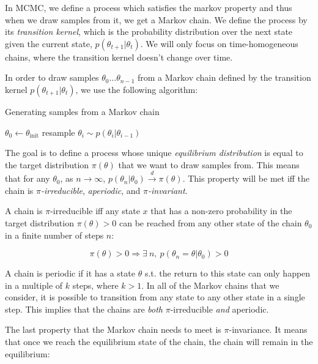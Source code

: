 \documentclass[12pt]{article}
\begin{document}
{In MCMC, we define a process which satisfies the markov property and thus when we draw samples from it, we get a Markov chain. We define the process by its \textit{transition kernel}, which is the probability distribution over the next state given the current state, $p(\theta_{t+1}|\theta_t)$. We will only focus on time-homogeneous chains, where the transition kernel doesn't change over time.

In order to draw samples $\theta_0 \ldots \theta_{n-1}$ from a Markov chain defined by the transition kernel $p(\theta_{t+1}|\theta_t)$, we use the following algorithm:

\begin{algorithm}
\caption{Generating samples from a Markov chain}
\label{alg_mh}
\begin{algorithmic}
\State $\theta_0 \gets \theta_{\textrm{init}}$
	\State resample $\theta_i \sim p(\theta_i|\theta_{i-1})$
\EndFor
\end{algorithmic}
\end{algorithm}

The goal is to define a process whose unique \textit{equilibrium distribution} is equal to the target distribution $\pi(\theta)$ that we want to draw samples from. This means that for any $\theta_0$, as $n \rightarrow \infty$, $p(\theta_n|\theta_0) \xrightarrow{d} \pi(\theta)$. This property will be met iff the chain is \textit{$\pi$-irreducible}, \textit{aperiodic}, and \textit{$\pi$-invariant}.

A chain is $\pi$-irreducible iff any state $x$ that has a non-zero probability in the target distribution $\pi(\theta) > 0$ can be reached from any other state of the chain $\theta_0$ in a finite number of steps $n$:

\begin{equation}
\pi(\theta) > 0 \Rightarrow \exists \ n, \ p(\theta_n = \theta|\theta_0) > 0
\end{equation}

A chain is periodic if it has a state $\theta$ s.t. the return to this state can only happen in a multiple of $k$ steps, where $k > 1$. In all of the Markov chains that we consider, it is possible to transition from any state to any other state in a single step. This implies that the chains are \textit{both} $\pi$-irreducible \textit{and} aperiodic.

The last property that the Markov chain needs to meet is $\pi$-invariance. It means that once we reach the equilibrium state of the chain, the chain will remain in the equilibrium:

}
\end{document}
